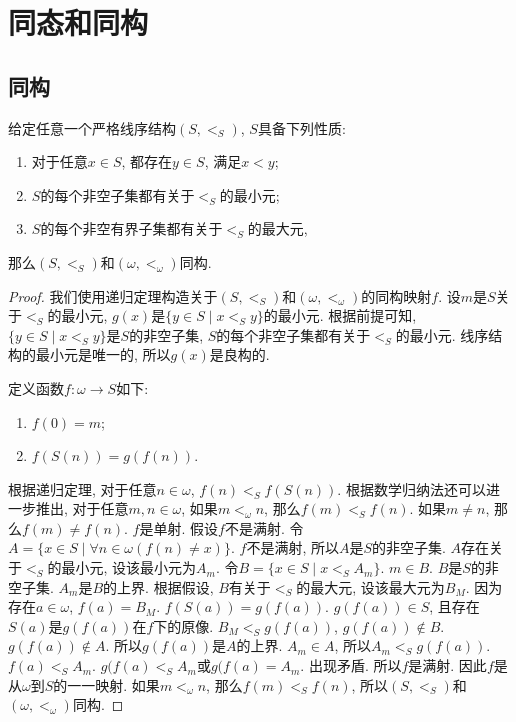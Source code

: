 \chapter{同态和同构}
\section{同构}
\begin{proposition}
	给定任意一个严格线序结构$(S,<_S)$, $S$具备下列性质:
	\begin{enumerate}[itemindent=1em]
		\item 对于任意$x\in S$, 都存在$y\in S$, 满足$x<y$;
		\item $S$的每个非空子集都有关于$<_S$的最小元;
		\item $S$的每个非空有界子集都有关于$<_S$的最大元,
	\end{enumerate}
	那么$(S,<_S)$和$(\omega,<_\omega)$同构.
\end{proposition}

\begin{proof}
	我们使用递归定理构造关于$(S,<_S)$和$(\omega,<_\omega)$的同构映射$f$. 设$m$是$S$关于$<_S$的最小元, $g(x)$是$\{y\in S\mid x<_Sy\}$的最小元. 根据前提可知, $\{y\in S\mid x<_Sy\}$是$S$的非空子集, $S$的每个非空子集都有关于$<_S$的最小元. 线序结构的最小元是唯一的, 所以$g(x)$是良构的.

	定义函数$f\colon \omega\rightarrow S$如下:
	\begin{enumerate}[itemindent=1em]
		\item $f(0)=m$;
		\item $f(S(n))=g(f(n))$.
	\end{enumerate}

	根据递归定理, 对于任意$n\in \omega$, $f(n)<_Sf(S(n))$. 根据数学归纳法还可以进一步推出, 对于任意$m,n\in \omega$, 如果$m<_\omega n$, 那么$f(m)<_Sf(n)$. 如果$m\neq n$, 那么$f(m)\neq f(n)$. $f$是单射. 假设$f$不是满射. 令$A=\{x\in S\mid \forall n\in \omega(f(n)\neq x)\}$. $f$不是满射, 所以$A$是$S$的非空子集. $A$存在关于$<_S$的最小元, 设该最小元为$A_m$. 令$B=\{x\in S\mid x<_SA_m\}$. $m\in B$. $B$是$S$的非空子集. $A_m$是$B$的上界. 根据假设, $B$有关于$<_S$的最大元, 设该最大元为$B_M$. 因为存在$a\in \omega$, $f(a)=B_M$. $f(S(a))=g(f(a))$. $g(f(a))\in S$, 且存在$S(a)$是$g(f(a))$在$f$下的原像. $B_M<_Sg(f(a))$, $g(f(a))\notin B$. $g(f(a))\notin A$. 所以$g(f(a))$是$A$的上界. $A_m\in A$, 所以$A_m<_Sg(f(a))$. $f(a)<_SA_m$. $g(f(a)<_SA_m$或$g(f(a)=A_m$. 出现矛盾. 所以$f$是满射. 因此$f$是从$\omega$到$S$的一一映射. 如果$m<_\omega n$, 那么$f(m)<_Sf(n)$, 所以$(S,<_S)$和$(\omega,<_\omega)$同构.
\end{proof}